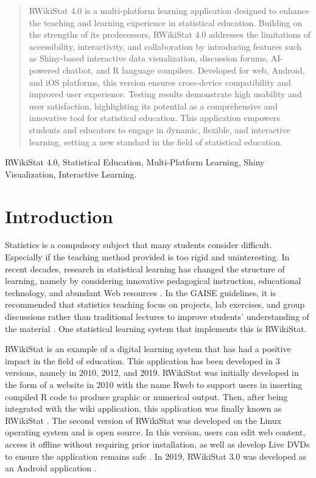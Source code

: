 \documentclass[conference,a4paper]{IEEEtran}
\begin{document}
\maketitle

\begin{abstract}
  RWikiStat 4.0 is a multi-platform learning application designed to enhance the teaching and learning experience in statistical education. Building on the strengths of its predecessors, RWikiStat 4.0 addresses the limitations of accessibility, interactivity, and collaboration by introducing features such as Shiny-based interactive data visualization, discussion forums, AI-powered chatbot, and R language compilers. Developed for web, Android, and iOS platforms, this version ensures cross-device compatibility and improved user experience. Testing results demonstrate high usability and user satisfaction, highlighting its potential as a comprehensive and innovative tool for statistical education. This application empowers students and educators to engage in dynamic, flexible, and interactive learning, setting a new standard in the field of statistical education.
\end{abstract}

\begin{IEEEkeywords}
  RWikiStat 4.0, Statistical Education, Multi-Platform Learning, Shiny Visualization, Interactive Learning.
\end{IEEEkeywords}

\section{Introduction}
\label{sect:introduction}

Statistics is a compulsory subject that many students consider difficult.
Especially if the teaching method provided is too rigid and uninteresting. In
recent decades, research in statistical learning has changed the structure of
learning, namely by considering innovative pedagogical instruction, educational
technology, and abundant Web resources \cite{b1}. In the GAISE guidelines, it
is recommended that statistics teaching focus on projects, lab exercises, and
group discussions rather than traditional lectures to improve students'
understanding of the material \cite{b2}. One statistical learning system that
implements this is RWikiStat.

RWikiStat is an example of a digital learning system that has had a positive
impact in the field of education. This application has been developed in 3
versions, namely in 2010, 2012, and 2019. RWikiStat was initially developed in
the form of a website in 2010 with the name Rweb to support users in inserting
compiled R code to produce graphic or numerical output. Then, after being
integrated with the wiki application, this application was finally known as
RWikiStat \cite{b3}. The second version of RWikiStat was developed on the Linux
operating system and is open source. In this version, users can edit web
content, access it offline without requiring prior installation, as well as
develop Live DVDs to ensure the application remains safe \cite{b4}. In 2019,
RWikiStat 3.0 was developed as an Android application \cite{b5}.
\end{document}
